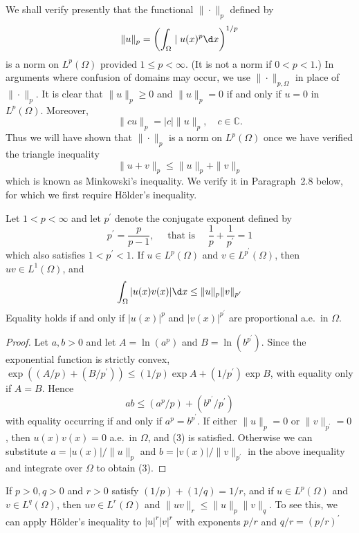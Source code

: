 \begin{para}
  We shall verify presently that the functional $\|\cdot\|_p$ defined by
  \[
  \|u\|_p=\left(\int_{\Omega} \mid u(x)^p \d x\right)^{1 / p}
  \]
  is a norm on $L^p(\Omega)$ provided $1 \leq p<\infty$. (It is not a norm if $0<p<1$.)
  In arguments where confusion of domains may occur, we use $\|\cdot\|_{p, \Omega}$ in place of $\|\cdot\|_p$. 
  It is clear that $\|u\|_p \geq 0$ and $\|u\|_p=0$ if and only if $u=0$ in $L^p(\Omega)$. Moreover,
  \[
  \|c u\|_p=|c|\|u\|_p, \quad c \in \mathbb{C} .
  \]
  Thus we will have shown that $\|\cdot\|_p$ is a norm on $L^p(\Omega)$ once we have verified the
  triangle inequality
  \[
  \|u+v\|_p \leq\|u\|_p+\|v\|_p
  \]
  which is known as Minkowski's inequality. We verify it in Paragraph~2.8 below,
  for which we first require Hölder's inequality.
\end{para}

\begin{theorem}
  Let $1<p<\infty$ and let $p^{\prime}$ denote the conjugate exponent defined by
  \[
  p^{\prime}=\frac{p}{p-1}, \quad \text { that is } \quad \frac{1}{p}+\frac{1}{p^{\prime}}=1
  \]
  which also satisfies $1<p^{\prime}<1$. If $u \in L^p(\Omega)$ and $v \in L^{p^{\prime}}(\Omega)$,
  then $u v \in L^1(\Omega)$, and
  \begin{equation}\label{eq:2.3}
    \int_{\Omega}|u(x) v(x)| \d x \leq\|u\|_p\|v\|_{p^{\prime}}
  \end{equation}
  Equality holds if and only if $|u(x)|^p$ and $|v(x)|^{p^{\prime}}$ are proportional a.e.~in $\Omega$.
\end{theorem}

\begin{proof}
  Let $a, b>0$ and let $A=\ln \left(a^p\right)$ and $B=\ln \left(b^{p^{\prime}}\right)$.
  Since the exponential function is strictly convex, $\exp \left((A / p)+\left(B / p^{\prime}\right)\right) \leq(1 / p) \exp A+\left(1 / p^{\prime}\right) \exp B$, with equality only if $A=B$. Hence
  \[
  a b \leq\left(a^p / p\right)+\left(b^{p^{\prime}} / p^{\prime}\right)
  \]
  with equality occurring if and only if $a^p=b^{p^{\prime}}$. If either $\|u\|_p=0$ or $\|v\|_{p^{\prime}}=0$, 
  then $u(x) v(x)=0$ a.e.~in $\Omega$, and (3) is satisfied. Otherwise we can substitute $a=|u(x)| /\|u\|_p$ and 
  $b=|v(x)| /\|v\|_{p^{\prime}}$ in the above inequality and integrate over $\Omega$ to obtain (3).
\end{proof}

\begin{corollary}
  If $p>0, q>0$ and $r>0$ satisfy $(1 / p)+(1 / q)=1 / r$, and if $u \in L^p(\Omega)$ and $v \in L^q(\Omega)$, then $u v \in L^r(\Omega)$ and $\|u v\|_r \leq\|u\|_p\|v\|_q$. To see this, we can apply Hölder's inequality to $|u|^r|v|^r$ with exponents $p / r$ and $q / r=(p / r)^{\prime}$
\end{corollary}

